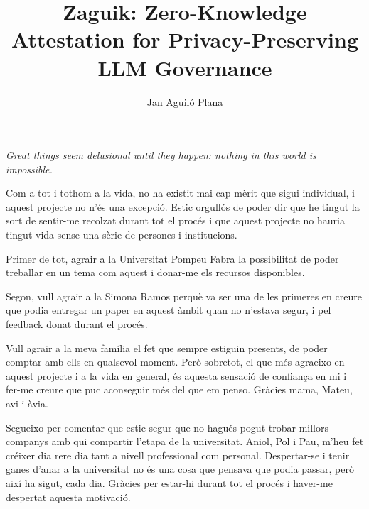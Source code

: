 \documentclass[11pt, a4paper, twoside, openany]{tfg_dtic_upf}
\title{Zaguik: Zero-Knowledge Attestation for Privacy-Preserving LLM Governance}
\author{Jan Aguil\'o Plana}
\let\cleardoublepage\clearpage
\theoremstyle{definition}
\theoremstyle{plain}
\numberwithin{equation}{section}
\begin{document}


\frontmatter

\maketitle

\cleardoublepage

\noindent \textit{Great things seem delusional until they happen: nothing in this world is impossible.}

\cleardoublepage


\medskip

Com a tot i tothom a la vida, no ha existit mai cap mèrit que sigui individual, i aquest projecte no n'és una excepció. Estic orgullós de poder dir que he tingut la sort de sentir-me recolzat durant tot el procés i que aquest projecte no hauria tingut vida sense una sèrie de persones i institucions.

\medskip

Primer de tot, agrair a la Universitat Pompeu Fabra la possibilitat de poder treballar en un tema com aquest i donar-me els recursos disponibles. 

\medskip

Segon, vull agrair a la Simona Ramos perquè va ser una de les primeres en creure que podia entregar un paper en aquest àmbit quan no n'estava segur, i pel feedback donat durant el procés.

\medskip

Vull agrair a la meva família el fet que sempre estiguin presents, de poder comptar amb ells en qualsevol moment. Però sobretot, el que més agraeixo en aquest projecte i a la vida en general, és aquesta sensació de confiança en mi i fer-me creure que puc aconseguir més del que em penso. Gràcies mama, Mateu, avi i àvia.

\medskip

Segueixo per comentar que estic segur que no hagués pogut trobar millors companys amb qui compartir l'etapa de la universitat. Aniol, Pol i Pau, m'heu fet créixer dia rere dia tant a nivell professional com personal. Despertar-se i tenir ganes d'anar a la universitat no és una cosa que pensava que podia passar, però així ha sigut, cada dia. Gràcies per estar-hi durant tot el procés i haver-me despertat aquesta motivació.
\end{document}

